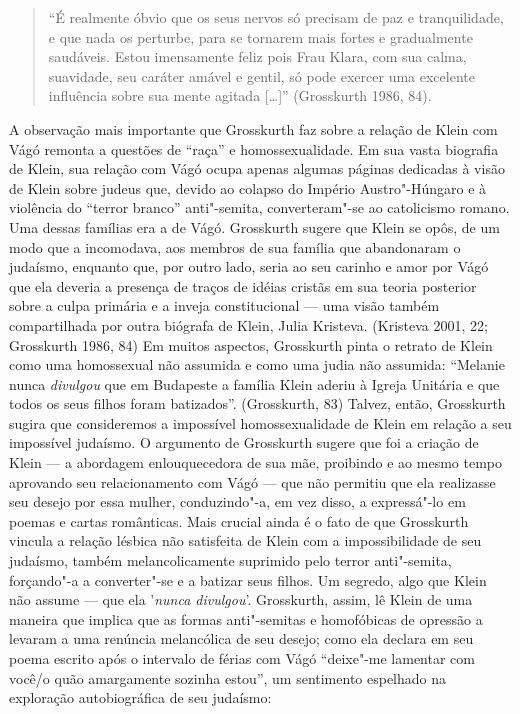 \begin{quote}
``É realmente óbvio que os seus nervos só precisam de paz e
tranquilidade, e que nada os perturbe, para se tornarem mais fortes e
gradualmente saudáveis. Estou imensamente feliz pois Frau Klara, com sua
calma, suavidade, seu caráter amável e gentil, só pode exercer uma
excelente influência sobre sua mente agitada {[}\ldots{}{]}'' (Grosskurth
1986, 84).
\end{quote}

A observação mais importante que Grosskurth faz sobre a relação de Klein
com Vágó remonta a questões de ``raça'' e homossexualidade. Em sua vasta
biografia de Klein, sua relação com Vágó ocupa apenas algumas páginas
dedicadas à visão de Klein sobre judeus que, devido ao colapso do
Império Austro"-Húngaro e à violência do ``terror branco'' anti"-semita,
converteram"-se ao catolicismo romano. Uma dessas famílias era a de Vágó.
Grosskurth sugere que Klein se opôs, de um modo que a incomodava, aos
membros de sua família que abandonaram o judaísmo, enquanto que, por
outro lado, seria ao seu carinho e amor por Vágó que ela deveria a
presença de traços de idéias cristãs em sua teoria posterior sobre a
culpa primária e a inveja constitucional --- uma visão também
compartilhada por outra biógrafa de Klein, Julia Kristeva. (Kristeva
2001, 22; Grosskurth 1986, 84) Em muitos aspectos, Grosskurth pinta o
retrato de Klein como uma homossexual não assumida e como uma judia não
assumida: ``Melanie nunca \emph{divulgou} que em Budapeste a família
Klein aderiu à Igreja Unitária e que todos os seus filhos foram
batizados''. (Grosskurth, 83) Talvez, então, Grosskurth sugira que
consideremos a impossível homossexualidade de Klein em relação a seu
impossível judaísmo. O argumento de Grosskurth sugere que foi a criação
de Klein --- a abordagem enlouquecedora de sua mãe, proibindo e ao mesmo
tempo aprovando seu relacionamento com Vágó --- que não permitiu que ela
realizasse seu desejo por essa mulher, conduzindo"-a, em vez disso, a
expressá"-lo em poemas e cartas românticas. Mais crucial ainda é o fato
de que Grosskurth vincula a relação lésbica não satisfeita de Klein com
a impossibilidade de seu judaísmo, também melancolicamente suprimido
pelo terror anti"-semita, forçando"-a a converter"-se e a batizar seus
filhos. Um segredo, algo que Klein não assume --- que ela '\emph{nunca
divulgou}'. Grosskurth, assim, lê Klein de uma maneira que implica que
as formas anti"-semitas e homofóbicas de opressão a levaram a uma
renúncia melancólica de seu desejo; como ela declara em seu poema
escrito após o intervalo de férias com Vágó ``deixe"-me lamentar com
você/o quão amargamente sozinha estou'', um sentimento espelhado na
exploração autobiográfica de seu judaísmo:

